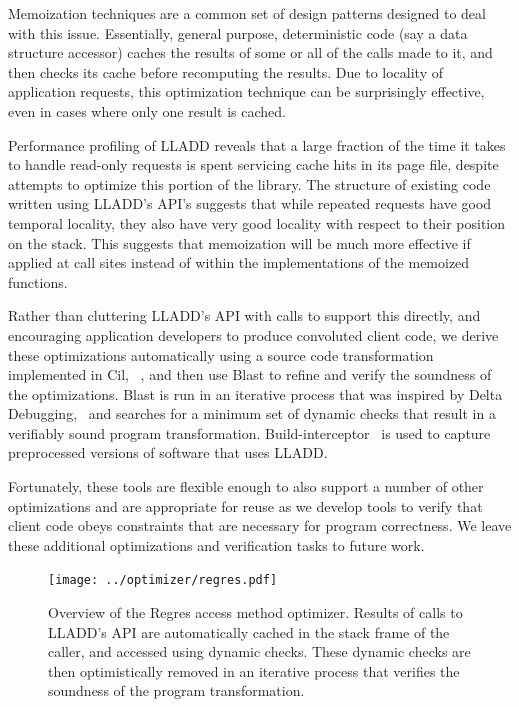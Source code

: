 \documentclass[10pt,letterpaper,twocolumn,english]{article}
\newcommand{\yad}{LLADD\xspace}
\begin{document}
Memoization techniques are a common set of design patterns designed to
deal with this issue.  Essentially, general purpose, deterministic
code (say a data structure accessor) caches the results of some or all
of the calls made to it, and then checks its cache before recomputing
the results.  Due to locality of application requests, this
optimization technique can be surprisingly effective, even in cases
where only one result is cached.

Performance profiling of \yad reveals that a large fraction of the time it
takes to handle read-only requests is spent servicing cache hits in
its page file, despite attempts to optimize this portion of the
library.  The structure of existing code written using \yad's API's
suggests that while repeated requests have good temporal locality,
they also have very good locality with respect to their position on
the stack.  This suggests that memoization will be much more effective
if applied at call sites instead of within the implementations of the
memoized functions.

Rather than cluttering \yad's API with calls to support this directly,
and encouraging application developers to produce convoluted client code, 
we derive these optimizations automatically using a source code 
transformation implemented in Cil, ~\cite{cil}, and then use 
Blast to refine and verify the
soundness of the optimizations.  Blast is run in an iterative process
that was inspired by Delta Debugging,~\cite{deltaDebugging} and searches for a minimum set
of dynamic checks that result in a verifiably sound program
transformation.  Build-interceptor~\cite{buildInterceptor} is used to capture preprocessed
versions of software that uses \yad.

Fortunately, these tools are flexible enough to also support a number
of other optimizations and are appropriate for reuse as we develop
tools to verify that client code obeys constraints that are necessary
for program correctness.  We leave these additional optimizations and
verification tasks to future work.


\begin{figure}
\texttt{[image: ../optimizer/regres.pdf]}
\vspace{-30pt}
\caption{\sf\label{fig:regres} Overview of the Regres access method
optimizer.  Results of calls to \yad's API are automatically cached in
the stack frame of the caller, and accessed using dynamic checks.
These dynamic checks are then optimistically removed in an iterative
process that verifies the soundness of the program transformation.}
\end{figure}
\end{document}
